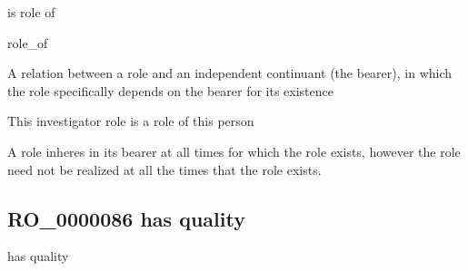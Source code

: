 \documentclass[letterpaper,10pt,english]{sphinxmanual}
\begin{document}
\begin{sphinxShadowBox}

\sphinxAtStartPar
is role of

\sphinxAtStartPar
role\_of
\end{sphinxShadowBox}

\begin{sphinxShadowBox}

\sphinxAtStartPar
{\hyperref[\detokenize{doc-RO_0000052::doc}]{}}
\end{sphinxShadowBox}

\begin{sphinxShadowBox}

\sphinxAtStartPar
A relation between a role and an independent continuant (the bearer), in which the role specifically depends on the bearer for its existence
\end{sphinxShadowBox}

\begin{sphinxShadowBox}

\sphinxAtStartPar
This investigator role is a role of this person
\end{sphinxShadowBox}

\begin{sphinxShadowBox}

\sphinxAtStartPar
A role inheres in its bearer at all times for which the role exists, however the role need not be realized at all the times that the role exists.
\end{sphinxShadowBox}

\begin{sphinxShadowBox}

\sphinxAtStartPar
{}
\end{sphinxShadowBox}
\begin{quote}

\ignorespaces \end{quote}


\subsection{RO\_0000086 \sphinxhyphen{} has quality}
\label{\detokenize{doc-RO_0000086:ro-0000086-has-quality}}\label{\detokenize{doc-RO_0000086:index-0}}\label{\detokenize{doc-RO_0000086::doc}}
\begin{sphinxShadowBox}

\sphinxAtStartPar
has quality
\end{sphinxShadowBox}
\end{document}
